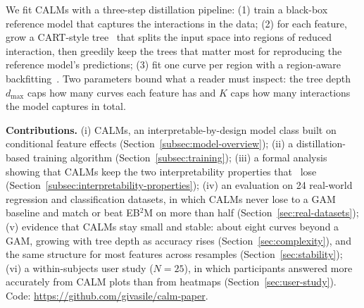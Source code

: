

We fit CALMs with a three-step distillation pipeline:
(1) train a black-box reference model that captures the interactions in the data;
(2) for each feature, grow a CART-style tree~\cite{breiman1984cart, herbinger2022REPID} that splits the input space into regions of reduced interaction, then greedily keep the trees that matter most for reproducing the reference model's predictions;
(3) fit one curve per region with a region-aware backfitting~\cite{buja1989linear}.
Two parameters bound what a reader must inspect: the tree depth $d_{\max}$ caps how many curves each feature has and $K$ caps how many interactions the model captures in total.

\textbf{Contributions.}
(i) CALMs, an interpretable-by-design model class built on conditional feature effects (Section~\ref{subsec:model-overview});
(ii) a distillation-based training algorithm (Section~\ref{subsec:training});
(iii) a formal analysis showing that CALMs keep the two interpretability properties that \gamms~lose (Section~\ref{subsec:interpretability-properties});
(iv) an evaluation on 24 real-world regression and classification datasets, in which CALMs never lose to a GAM baseline and match or beat EB$^2$M on more than half (Section~\ref{sec:real-datasets});
(v) evidence that CALMs stay small and stable: about eight curves beyond a GAM, growing with tree depth as accuracy rises (Section~\ref{sec:complexity}), and the same structure for most features across resamples (Section~\ref{sec:stability});
(vi) a within-subjects user study ($N=25$), in which participants answered more accurately from CALM plots than from \gamm{} heatmaps (Section~\ref{sec:user-study}).
Code: \url{https://github.com/givasile/calm-paper}.
